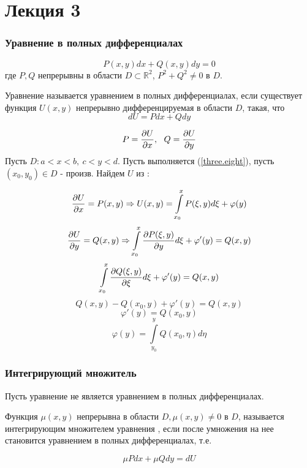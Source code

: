   \section{Лекция 3}
  \subsubsection{Уравнение в полных дифференциалах}
  \begin{equation}
  \label{three.five}
  \boxed{P(x, y)dx + Q(x,y)dy = 0}
  \end{equation} 
  где $P, Q$ непрерывны в области $D \subset \mathbb{R}^2$, $P^2 + Q^2 \neq 0$ в $D$. 
  
  Уравнение называется уравнением в полных дифференциалах, если существует функция $U(x, y)$ непрерывно дифференцируемая в области $D$, такая, что 
  \begin{equation}
    \label{three.seven}
    dU = Pdx + Qdy
  \end{equation}

  \begin{equation}
    \label{three.eight}
    P = \frac{\partial {U}}{\partial {x}}, ~~ Q = \frac{\partial {U}}{\partial {y}}
  \end{equation} 
  Пусть $D: a < x < b,~ c < y < d$. Пусть выполняется (\ref{three.eight}), пусть $(x_0, y_0) \in D$ - произв. Найдем $U$ из :

  \[ \frac{\partial {U}}{\partial {x}} = P(x, y) \Rightarrow U(x, y) = \int\limits_{x_0}^xP(\xi, y)d\xi + \varphi(y) \]
  \[ \frac{\partial {U}}{\partial {y}} = Q(x, y) \Rightarrow \int\limits_{x_0}^{x}\frac{\partial {P(\xi, y)}}{\partial {y}}d\xi + \varphi'(y) = Q(x, y) \]
  \[ \int\limits_{x_0}^{x}\frac{\partial {Q(\xi, y)}}{\partial {\xi}}d\xi + \varphi'(y) = Q(x, y) \]
  \[ Q(x, y) - Q(x_0, y) + \varphi'(y) = Q(x ,y) \]
  \[ \varphi'(y) = Q(x_0, y) \]
  \[ \varphi(y) = \int\limits_{y_0}^{y}Q(x_0, \eta)d\eta \]

  \subsubsection{Интегрирующий множитель}
  Пусть уравнение  не является уравнением в полных дифференциалах.
  \begin{df}
  Функция $\mu(x, y)$ непрерывна в области $D, \mu(x, y) \neq 0$ в $D$, называется интегрирующим множителем уравнения , если после умножения на нее  становится уравнением в полных дифференциалах, т.е.

  \[ \mu Pdx + \mu Qdy = dU \]
  \end{df}

